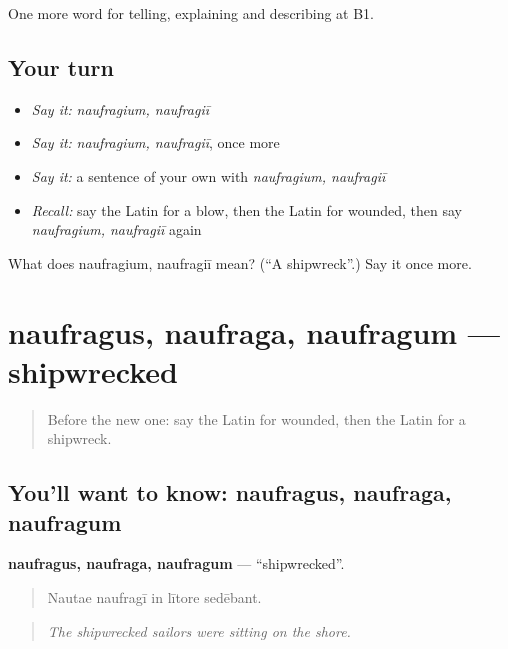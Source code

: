 \begin{grammarlens}[title={What you've built}]
One more word for telling, explaining and describing at B1.
\end{grammarlens}

\subsection*{Your turn}
\begin{itemize}
\raggedright
  \item \emph{Say it:} \emph{naufragium, naufragiī}
  \item \emph{Say it:} \emph{naufragium, naufragiī}, once more
  \item \emph{Say it:} a sentence of your own with \emph{naufragium, naufragiī}
  \item \emph{Recall:} say the Latin for a blow, then the Latin for wounded, then say \emph{naufragium, naufragiī} again
\end{itemize}

\begin{tcolorbox}[breakable,colback=teal!4,colframe=teal!35!black,title={Before you move on}]
What does naufragium, naufragiī mean? (\textquotedblleft{}A shipwreck\textquotedblright{}.) Say it once more.
\end{tcolorbox}
\section[naufragus, naufraga, naufragum]{naufragus, naufraga, naufragum — shipwrecked}

\label{lesson:LA-C315-naufragus}



\begin{quote}
Before the new one: say the Latin for wounded, then the Latin for a shipwreck.
\end{quote}

\subsection*{You'll want to know: naufragus, naufraga, naufragum}
\textbf{naufragus, naufraga, naufragum} — \textquotedblleft{}shipwrecked\textquotedblright{}.

\begin{quote}
Nautae naufragī in lītore sedēbant.
\end{quote}

\begin{quote}
\emph{The shipwrecked sailors were sitting on the shore.}
\end{quote}

